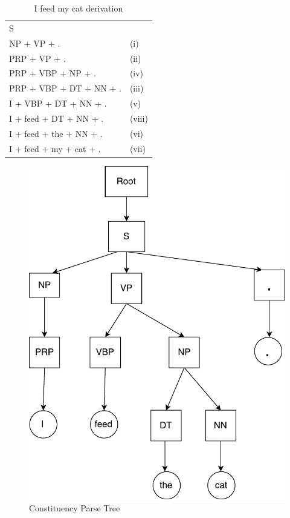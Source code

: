 
\begin{table}[H]
	\centering
	\begin{tabular}{ll}
	S	&  \\
	NP + VP + .	& (i) \\
	PRP + VP + .	& (ii) \\
	PRP + VBP + NP + .	& (iv)  \\
	PRP + VBP + DT + NN + .	& (iii) \\
	I + VBP + DT + NN + .	&  (v) \\
	I + feed + DT + NN + .	&  (viii) \\
	I + feed + the + NN + .	&  (vi) \\
	I + feed + my + cat + .	& (vii)
	\end{tabular}
\caption{I feed my cat derivation}
\label{ifeedmycat}
\end{table}




\begin{figure}[H]
	\centering
	\includegraphics[width=0.5\linewidth]{figure/ifeedthecatconstituency}
	\caption[Constituency Parse Tree]{Constituency Parse Tree}
	\label{fig:ifeedthecatconstituency}
\end{figure}





